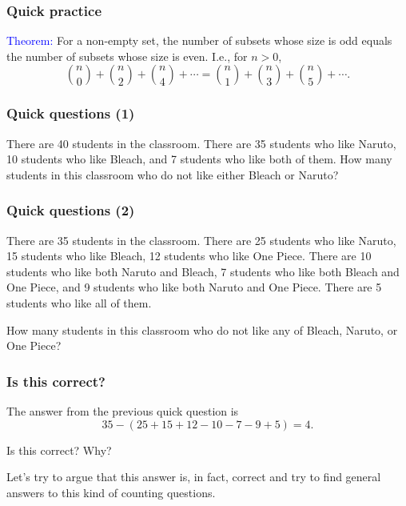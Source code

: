 

\begin{frame}\frametitle{Quick practice}
  \textcolor{blue}{Theorem:} For a non-empty set, the number of subsets whose size is odd equals the number of subsets whose size is even. \pause
  I.e., for $n>0$,
  \[
  \binom{n}{0} + \binom{n}{2} + \binom{n}{4} + \cdots =
  \binom{n}{1} + \binom{n}{3} + \binom{n}{5} + \cdots.
  \]

  \pause

  \vspace{2in}

\end{frame}

\begin{frame}\frametitle{Quick questions (1)}
  \begin{tcolorbox}
    There are 40 students in the classroom.  There are 35 students who
    like Naruto, 10 students who like Bleach, and 7 students who like
    both of them.  How many students in this classroom who do not like
    either Bleach or Naruto?
  \end{tcolorbox}

  \vspace{2in}
\end{frame}

\begin{frame}\frametitle{Quick questions (2)}
  \begin{tcolorbox}
    There are 35 students in the classroom.  There are 25 students who
    like Naruto, 15 students who like Bleach, 12 students who like One
    Piece.  There are 10 students who like both Naruto and Bleach, 7
    students who like both Bleach and One Piece, and 9 students who
    like both Naruto and One Piece.  There are 5 students who like all
    of them.

    How many students in this classroom who do not like any of Bleach,
    Naruto, or One Piece?
  \end{tcolorbox}

  \vspace{1.2in}
\end{frame}

\begin{frame}\frametitle{Is this correct?}
  The answer from the previous quick question is
  \[ 35 - (25 + 15 + 12 - 10 - 7 - 9 + 5) = 4.\]

  Is this correct?  Why?

  \pause

  \vspace{0.2in}

  Let's try to argue that this answer is, in fact, correct and try to
  find general answers to this kind of counting questions.
\end{frame}

